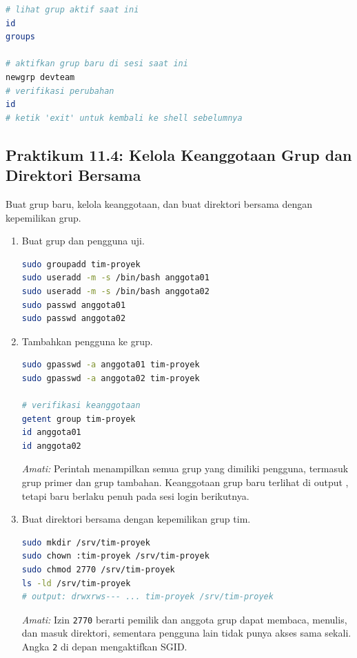 \begin{lstlisting}[language=bash, caption={Mengaktifkan grup baru tanpa logout}]
# lihat grup aktif saat ini
id
groups

# aktifkan grup baru di sesi saat ini
newgrp devteam
# verifikasi perubahan
id
# ketik 'exit' untuk kembali ke shell sebelumnya
\end{lstlisting}

\subsection*{Praktikum 11.4: Kelola Keanggotaan Grup dan Direktori Bersama}

Buat grup baru, kelola keanggotaan, dan buat direktori bersama dengan kepemilikan grup.

\begin{enumerate}
    \item Buat grup dan pengguna uji.
\begin{lstlisting}[language=bash, caption={Membuat grup dan pengguna uji}]
sudo groupadd tim-proyek
sudo useradd -m -s /bin/bash anggota01
sudo useradd -m -s /bin/bash anggota02
sudo passwd anggota01
sudo passwd anggota02
\end{lstlisting}

    \item Tambahkan pengguna ke grup.
\begin{lstlisting}[language=bash, caption={Menambahkan anggota ke grup}]
sudo gpasswd -a anggota01 tim-proyek
sudo gpasswd -a anggota02 tim-proyek

# verifikasi keanggotaan
getent group tim-proyek
id anggota01
id anggota02
\end{lstlisting}

    \textit{Amati:} Perintah  menampilkan semua grup yang dimiliki pengguna, termasuk grup primer dan grup tambahan. Keanggotaan grup baru terlihat di output , tetapi baru berlaku penuh pada sesi login berikutnya.

    \item Buat direktori bersama dengan kepemilikan grup tim.
\begin{lstlisting}[language=bash, caption={Direktori bersama untuk tim proyek}]
sudo mkdir /srv/tim-proyek
sudo chown :tim-proyek /srv/tim-proyek
sudo chmod 2770 /srv/tim-proyek
ls -ld /srv/tim-proyek
# output: drwxrws--- ... tim-proyek /srv/tim-proyek
\end{lstlisting}

    \textit{Amati:} Izin \texttt{2770} berarti pemilik dan anggota grup dapat membaca, menulis, dan masuk direktori, sementara pengguna lain tidak punya akses sama sekali. Angka \texttt{2} di depan mengaktifkan SGID.


\end{enumerate}
